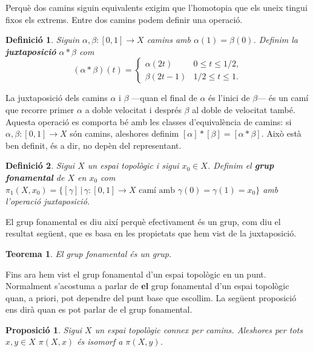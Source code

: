 \documentclass{article}
\newtheorem{teorema}{Teorema}
\newtheorem{definicio}{Definici\'{o}}
\newtheorem{proposicio}{Proposici\'{o}}
\theoremstyle{definition}
\begin{document}
Perqu\`{e} dos camins siguin equivalents exigim que l'homotopia que els uneix tingui fixos els extrems. Entre dos camins podem definir una operaci\'{o}.

\begin{definicio}
Siguin $\alpha,\beta:[0,1]\rightarrow X$ camins amb $\alpha(1)=\beta(0)$. Definim la \textbf{juxtaposici\'{o}} $\alpha*\beta$ com
\[(\alpha*\beta)(t)=\left\{\begin{array}{ll}\alpha(2t)&0\leq t\leq1/2,\\\beta(2t-1)&1/2\leq t\leq1.\end{array}\right.\]
\end{definicio}

La juxtaposici\'{o} dels camins $\alpha$ i $\beta$ ---quan el final de $\alpha$ \'{e}s l'inici de $\beta$--- \'{e}s un cam\'{i} que recorre primer $\alpha$ a doble velocitat i despr\'{e}s $\beta$ al doble de velocitat tamb\'{e}. Aquesta operaci\'{o} es comporta b\'{e} amb les classes d'equival\`{e}ncia de camins: si $\alpha,\beta:[0,1]\rightarrow X$ s\'{o}n camins, aleshores definim $[\alpha]*[\beta]=[\alpha*\beta]$. Aix\`{o} est\`{a} ben definit, \'{e}s a dir, no dep\`{e}n del representant.

\begin{definicio}
Sigui $X$ un espai topol\`{o}gic i sigui $x_0\in X$. Definim el \textbf{grup fonamental} de $X$ en $x_0$ com $\pi_1(X,x_0)=\{[\gamma]\,|\,\gamma:[0,1]\rightarrow X\text{ cam\'{i} amb }\gamma(0)=\gamma(1)=x_0\}$ amb l'operaci\'{o} juxtaposici\'{o}.
\end{definicio}

El grup fonamental es diu aix\'{i} perqu\`{e} efectivament \'{e}s un grup, com diu el resultat seg\"{u}ent, que es basa en les propietats que hem vist de la juxtaposici\'{o}.

\begin{teorema}
El grup fonamental \'{e}s un grup.
\end{teorema}

Fins ara hem vist el grup fonamental d'un espai topol\`{o}gic en un punt. Normalment s'acostuma a parlar de \textbf{el} grup fonamental d'un espai topol\`{o}gic quan, a priori, pot dependre del punt base que escollim. La seg\"{u}ent proposici\'{o} ens dir\`{a} quan es pot parlar de el grup fonamental.

\begin{proposicio}
Sigui $X$ un espai topol\`{o}gic connex per camins. Aleshores per tots $x,y\in X$ $\pi(X,x)$ \'{e}s isomorf a $\pi(X,y)$.
\end{proposicio}
\end{document}
